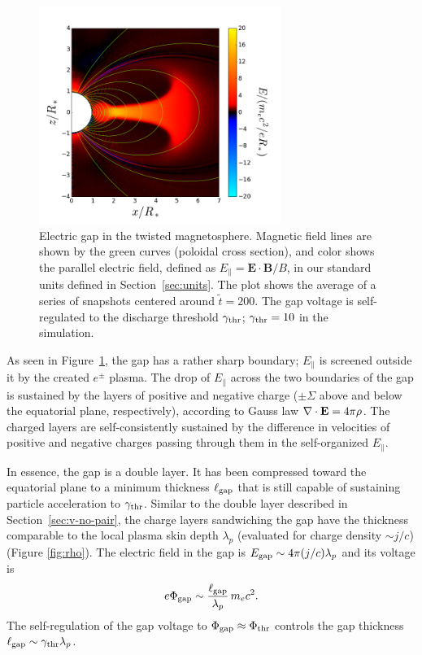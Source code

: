 \begin{figure}[t]
  \centering
  \includegraphics[width=0.7\textwidth]{pics/chap4/EdotB.png}
  \caption[Electric gap in magnetar magnetosphere]{Electric gap in the twisted
    magnetosphere. Magnetic field lines are shown by the green curves (poloidal
    cross section), and color shows the parallel electric field, defined as
    $E_\parallel=\mathbf{E}\cdot \mathbf{B}/B$, in our standard units defined in
    Section~\ref{sec:units}. The plot shows the average of a series of snapshots
    centered around $\tilde{t} = 200$. The gap voltage is self-regulated to the
    discharge threshold $\gamma_{\rm thr}$; $\gamma_{\rm thr}=10$ in the simulation.}
  \label{fig:EdotB}
\end{figure}

As seen in Figure~\ref{fig:EdotB}, the gap has a rather sharp boundary;
$E_\parallel$ is screened outside it by the created $e^\pm$ plasma.
The drop of $E_\parallel$ across the two boundaries of the gap is sustained by the layers
of positive and negative charge ($\pm\Sigma$ above and below the equatorial plane,
respectively), according to Gauss law $\nabla\cdot{\mathbf E}=4\pi\rho$.
The charged layers are self-consistently sustained by the difference in velocities of
positive and negative charges passing through them in the self-organized $E_\parallel$.

In essence, the gap is a double layer. It has been compressed toward
the equatorial plane to a minimum thickness $\ell_{\rm gap}$ that is still capable of sustaining
particle acceleration to $\gamma_{\rm thr}$.
Similar to the double layer described in Section~\ref{sec:v-no-pair}, the charge layers sandwiching
the gap have the thickness comparable to the local plasma skin depth $\lambda_p$
(evaluated for charge density $\sim j/c$) (Figure \ref{fig:rho}).
The electric field in the gap is $E_{\rm gap}\sim 4\pi (j/c)\lambda_p$ and its voltage is
\begin{equation}
  e\Phi_{\rm gap}\sim \frac{\ell_{\rm gap}}{\lambda_p}\,m_ec^2.
\end{equation}
The self-regulation of the gap voltage to $\Phi_{\rm gap}\approx \Phi_{\rm thr}$
controls the gap thickness $\ell_{\rm gap}\sim\gamma_{\rm thr}\lambda_p$.

